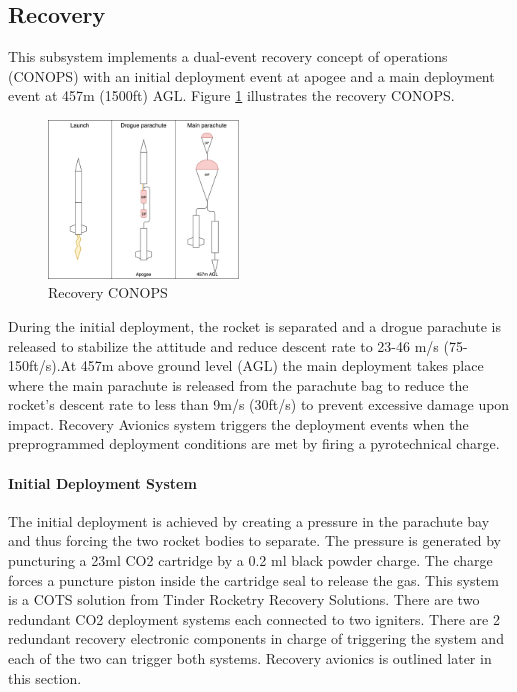 \subsection{Recovery}
This subsystem implements a dual-event recovery concept of operations (CONOPS) with an initial deployment event at apogee and a main deployment event at 457m (1500ft) AGL. Figure \ref{f:recovery_conops} illustrates the recovery CONOPS.
\begin{figure}[h!]
 	\centering
        \includegraphics[width=0.45\textwidth]{img/recovery_conops_schema.png}
        \caption{Recovery CONOPS}
        \label{f:recovery_conops}
 \end{figure}

During the initial deployment, the rocket is separated and a drogue parachute is released to stabilize the attitude and reduce descent rate to 23-46 m/s (75-150ft/s).At 457m above ground level (AGL) the main deployment takes place where the main parachute is released from the parachute bag to reduce the rocket's descent rate to less than 9m/s (30ft/s) to prevent excessive damage upon impact. Recovery Avionics system triggers the deployment events when the preprogrammed deployment conditions are met by firing a pyrotechnical charge.

\paragraph{Initial Deployment System}
\hfill \break
The initial deployment is achieved by creating a pressure in the parachute bay and thus forcing the two rocket bodies to separate. The pressure is generated by puncturing a 23ml CO2 cartridge by a 0.2 ml black powder charge. The charge forces a puncture piston inside the cartridge seal to release the gas. This system is a COTS solution from Tinder Rocketry Recovery Solutions.
There are two redundant CO2 deployment systems each connected to two igniters. There are 2 redundant recovery electronic components in charge of triggering the system and each of the two can trigger both systems. Recovery avionics is outlined later in this section.


